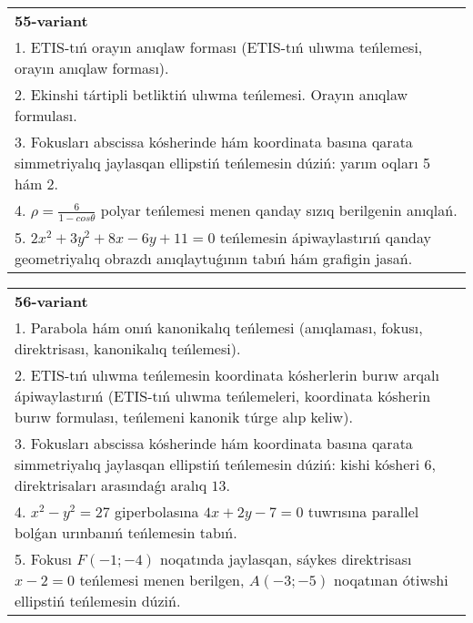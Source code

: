 \documentclass{article}
\begin{document}
\begin{tabular}{m{17cm}}
\textbf{55-variant}\\
1. ETIS-tıń orayın anıqlaw forması (ETIS-tıń ulıwma teńlemesi, orayın anıqlaw forması).\\

2. Ekinshi tártipli betliktiń ulıwma teńlemesi. Orayın anıqlaw formulası.\\

3. Fokusları abscissa kósherinde hám koordinata basına qarata simmetriyalıq jaylasqan ellipstiń teńlemesin dúziń: yarım oqları 5 hám 2.\\

4. $\rho = \frac{6}{1 - cos\theta}$ polyar teńlemesi menen qanday sızıq berilgenin anıqlań.  \\

5. $2x^{2} + 3y^{2} + 8x - 6y + 11 = 0$ teńlemesin ápiwaylastırıń qanday geometriyalıq obrazdı anıqlaytuǵının tabıń hám grafigin jasań.
\end{tabular}
\vspace{1cm}


\begin{tabular}{m{17cm}}
\textbf{56-variant}\\
1. Parabola hám onıń kanonikalıq teńlemesi (anıqlaması, fokusı, direktrisası, kanonikalıq teńlemesi).\\

2. ETIS-tıń ulıwma teńlemesin koordinata kósherlerin burıw arqalı ápiwaylastırıń (ETIS-tıń ulıwma teńlemeleri, koordinata kósherin burıw formulası, teńlemeni kanonik túrge alıp keliw).\\

3. Fokusları abscissa kósherinde hám koordinata basına qarata simmetriyalıq jaylasqan ellipstiń teńlemesin dúziń: kishi kósheri $6$, direktrisaları arasındaǵı aralıq $13$.\\

4. $x^{2} - y^{2} = 27$ giperbolasına $4x + 2y - 7 = 0$ tuwrısına parallel bolǵan urınbanıń teńlemesin tabıń.  \\

5. Fokusı $F( - 1; - 4)$ noqatında jaylasqan, sáykes direktrisası $x - 2 = 0$ teńlemesi menen berilgen, $A( - 3; - 5)$ noqatınan ótiwshi ellipstiń teńlemesin dúziń.  
\end{tabular}
\vspace{1cm}
\end{document}
